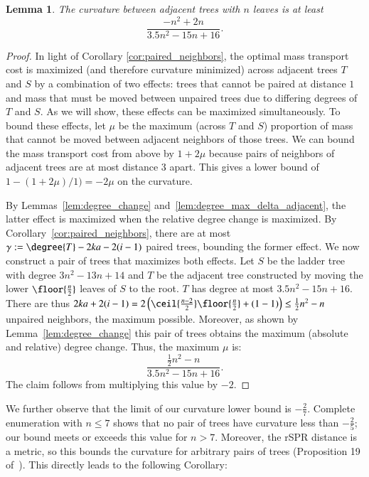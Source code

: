 \documentclass[]{elsarticle}
\newtheorem{lem}[thm]{Lemma}
\newcommand{\overlap}{%
	\gamma
}
\begin{document}
\begin{lem}
\label{lem:curvature_lower_bound}
	The curvature between adjacent trees with $n$ leaves is at least
	$$\frac{-n^2 + 2n}{3.5n^2 - 15n + 16}.$$
\end{lem}
\begin{proof}
    In light of Corollary \ref{cor:paired_neighbors}, the optimal mass transport cost is maximized (and therefore curvature minimized) across adjacent trees $T$ and $S$ by a combination of two effects: trees that cannot be paired at distance $1$ and mass that must be moved between unpaired trees due to differing degrees of $T$ and $S$.
		As we will show, these effects can be maximized simultaneously.
    To bound these effects, let $\mu$ be the maximum (across $T$ and $S$) proportion of mass that cannot be moved between adjacent neighbors of those trees.
    We can bound the mass transport cost from above by $1 + 2\mu$ because pairs of neighbors of adjacent trees are at most distance 3 apart.
	This gives a lower bound of $1 - (1 + 2\mu) / 1) = -2\mu$ on the curvature.

	By Lemmas~\ref{lem:degree_change} and~\ref{lem:degree_max_delta_adjacent}, the latter effect is maximized when the relative degree change is maximized.
	By Corollary~\ref{cor:paired_neighbors}, there are at most $\overlap := \degree{T} -2ka - 2(i-1)$ paired trees, bounding the former effect.
	We now construct a pair of trees that maximizes both effects.
	Let $S$ be the ladder tree with degree $3n^2 - 13n + 14$ and $T$ be the adjacent tree constructed by moving the lower $\floor{\frac{n}{2}}$ leaves of $S$ to the root.
	$T$ has degree at most $3.5n^2 -15n + 16$.
	There are thus $2ka + 2(i-1) = 2\left(\ceil{\frac{n-2}{2}}\floor{\frac{n}{2}} +(1-1)\right) \le \frac{1}{2}n^2 - n$ unpaired neighbors, the maximum possible.
	Moreover, as shown by Lemma~\ref{lem:degree_change} this pair of trees obtains the maximum (absolute and relative) degree change.
	Thus, the maximum $\mu$ is:
	$$\frac{\frac{1}{2}n^2 - n}{3.5n^2 - 15n + 16}.$$
	The claim follows from multiplying this value by $-2$.
\end{proof}

We further observe that the limit of our curvature lower bound is $-\frac{2}{7}$.
Complete enumeration with $n \le 7$ shows that no pair of trees have curvature less than $-\frac{2}{5}$; our bound meets or exceeds this value for $n > 7$.
Moreover, the rSPR distance is a metric, so this bounds the curvature for arbitrary pairs of trees (Proposition 19 of~\citep{Ollivier2009-bw}).
This directly leads to the following Corollary:
\end{document}
